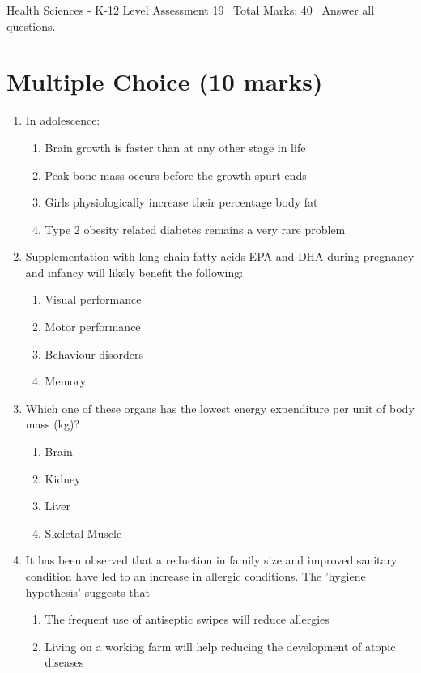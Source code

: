 \documentclass[12pt]{article}
\begin{document}
\begin{center}
Health Sciences - K-12 Level Assessment 19 \
Total Marks: 40 \
Answer all questions.
\end{center}

\section*{Multiple Choice (10 marks)}
\begin{enumerate}[label=\arabic*.]
\item In adolescence:
\begin{enumerate}[label=(\alph*)]
    \item Brain growth is faster than at any other stage in life
    \item Peak bone mass occurs before the growth spurt ends
    \item Girls physiologically increase their percentage body fat
    \item Type 2 obesity related diabetes remains a very rare problem
\end{enumerate}
\item Supplementation with long-chain fatty acids EPA and DHA during pregnancy and infancy will likely benefit the following:
\begin{enumerate}[label=(\alph*)]
    \item Visual performance
    \item Motor performance
    \item Behaviour disorders
    \item Memory
\end{enumerate}
\item Which one of these organs has the lowest energy expenditure per unit of body mass (kg)?
\begin{enumerate}[label=(\alph*)]
    \item Brain
    \item Kidney
    \item Liver
    \item Skeletal Muscle
\end{enumerate}
\item It has been observed that a reduction in family size and improved sanitary condition have led to an increase in allergic conditions. The 'hygiene hypothesis' suggests that
\begin{enumerate}[label=(\alph*)]
    \item The frequent use of antiseptic swipes will reduce allergies
    \item Living on a working farm will help reducing the development of atopic diseases

\end{enumerate}
\end{enumerate}
\end{document}
